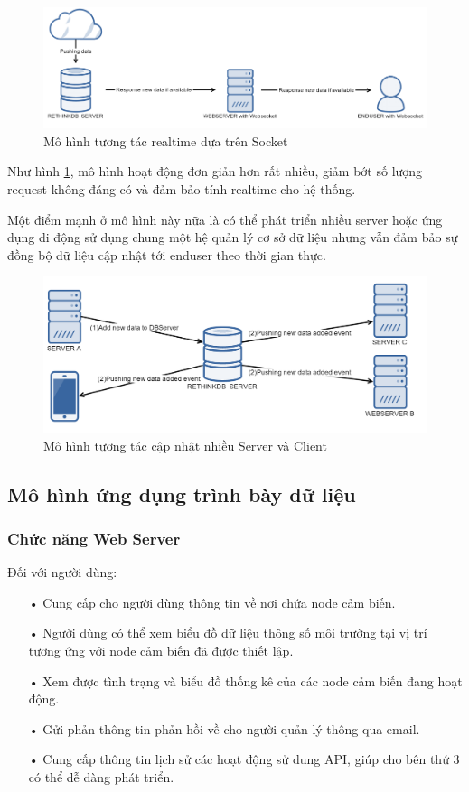 \begin{figure}[H]
	\centering    
	\includegraphics[width=1.0\textwidth]{realtime}
	\caption[Mô hình tương tác realtime dựa trên Socket]{Mô hình tương tác realtime dựa trên Socket}
	\label{fig: realtime}
\end{figure}

Như hình \ref{fig: realtime}, mô hình hoạt động đơn giản hơn rất nhiều, giảm bớt số lượng request không đáng có và đảm bảo tính realtime cho hệ thống.

Một điểm mạnh ở mô hình này nữa là có thể phát triển nhiều server hoặc ứng dụng di động sử dụng chung một hệ quản lý cơ sở dữ liệu nhưng vẫn đảm bảo sự đồng bộ dữ liệu cập nhật tới enduser theo thời gian thực.
\begin{figure}[H]
	\centering    
	\includegraphics[width=1.0\textwidth]{multiserver}
	\caption[Mô hình tương tác cập nhật nhiều Server]{Mô hình tương tác cập nhật nhiều Server và Client}
	\label{fig: multiserver}
\end{figure}
\subsection{Mô hình ứng dụng trình bày dữ liệu}
\subsubsection*{Chức năng Web Server}
Đối với người dùng:
\begin{itemize}
\item[•] Cung cấp cho người dùng thông tin về nơi chứa node cảm biến.
\item[•] Người dùng có thể xem biểu đồ dữ liệu thông số môi trường tại vị trí tương ứng với node cảm biến đã được thiết lập.
\item[•] Xem được tình trạng và biểu đồ thống kê của các node cảm biến đang hoạt động.
\item[•] Gửi phản thông tin phản hồi về cho người quản lý thông qua email.
\item[•] Cung cấp thông tin lịch sử các hoạt động sử dung API, giúp cho bên thứ 3 có thể dễ dàng phát triển.
\end{itemize}

